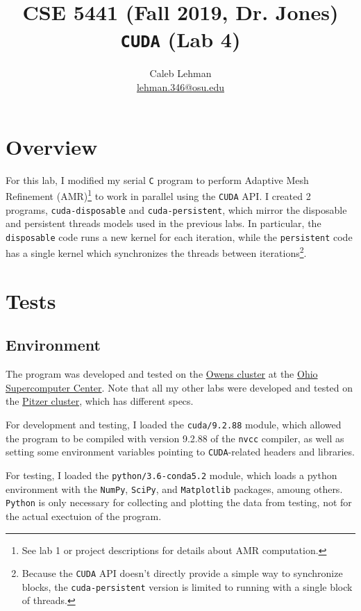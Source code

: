 \documentclass{article}
\title{\vspace{-2em}
CSE 5441 (Fall 2019, Dr. Jones)\\
\large \texttt{CUDA} (Lab 4)
}
\author{
Caleb Lehman \\
\href{mailto:lehman.346@osu.edu}{lehman.346@osu.edu}
}
\begin{document}
\maketitle

\section*{Overview}
\label{sec:overview}

For this lab, I modified my serial \texttt{C} program to perform Adaptive Mesh
Refinement (AMR)\footnote{See lab 1 or project descriptions for details about
AMR computation.} to work in parallel using the \texttt{CUDA} API. I created 2 programs,
\texttt{cuda-disposable} and \texttt{cuda-persistent}, which mirror the
disposable and persistent threads models used in the previous labs. In
particular, the \texttt{disposable} code runs a new kernel for each iteration,
while the \texttt{persistent} code has a single kernel which synchronizes the
threads between iterations\footnote{Because the \texttt{CUDA} API doesn't directly provide a simple way
to synchronize blocks, the \texttt{cuda-persistent} version is limited to running with a single block of
threads.}.

\section*{Tests}
\label{sec:tests}

\subsection*{Environment}
\label{subsec:environment}

The program was developed and tested on the
\href{https://www.osc.edu/resources/technical_support/supercomputers/owens}{Owens
cluster} at the \href{https://www.osc.edu/}{Ohio Supercomputer Center}.  Note
that all my other labs were developed and tested on the
\href{https://www.osc.edu/resources/technical_support/supercomputers/pitzer}{Pitzer
cluster}, which has different specs.

For development and testing, I loaded the \texttt{cuda/9.2.88} module, which
allowed the program to be compiled with version 9.2.88 of the \texttt{nvcc}
compiler, as well as setting some environment variables pointing to
\texttt{CUDA}-related headers and libraries.

For testing, I loaded the \texttt{python/3.6-conda5.2} module, which loads a
python environment with the \texttt{NumPy}, \texttt{SciPy}, and
\texttt{Matplotlib} packages, amoung others. \texttt{Python} is only necessary
for collecting and plotting the data from testing, not for the actual exectuion
of the program.
\end{document}
